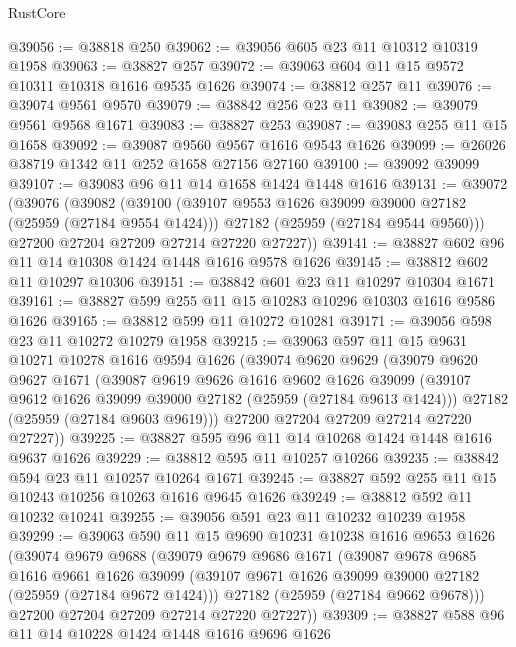 \begin{lexlean}{RustCore}
\begin{coremodule}
@39056 := @38818 @250
@39062 := @39056 @605 @23 @11 @10312 @10319 @1958
@39063 := @38827 @257
@39072 := @39063 @604 @11 @15 @9572 @10311 @10318 @1616 @9535 @1626
@39074 := @38812 @257 @11
@39076 := @39074 @9561 @9570
@39079 := @38842 @256 @23 @11
@39082 := @39079 @9561 @9568 @1671
@39083 := @38827 @253
@39087 := @39083 @255 @11 @15 @1658
@39092 := @39087 @9560 @9567 @1616 @9543 @1626
@39099 := @26026 @38719 @1342 @11 @252 @1658 @27156 @27160
@39100 := @39092 @39099
@39107 := @39083 @96 @11 @14 @1658 @1424 @1448 @1616
@39131 := @39072
    (@39076
      (@39082
        (@39100
          (@39107 @9553 @1626 @39099 @39000 @27182 (@25959 (@27184 @9554 @1424)))
          @27182
          (@25959 (@27184 @9544 @9560)))
        @27200
        @27204
        @27209
        @27214
        @27220
        @27227))
@39141 := @38827 @602 @96 @11 @14 @10308 @1424 @1448 @1616 @9578 @1626
@39145 := @38812 @602 @11 @10297 @10306
@39151 := @38842 @601 @23 @11 @10297 @10304 @1671
@39161 := @38827 @599 @255 @11 @15 @10283 @10296 @10303 @1616 @9586 @1626
@39165 := @38812 @599 @11 @10272 @10281
@39171 := @39056 @598 @23 @11 @10272 @10279 @1958
@39215 := @39063
    @597
    @11
    @15
    @9631
    @10271
    @10278
    @1616
    @9594
    @1626
    (@39074
      @9620
      @9629
      (@39079
        @9620
        @9627
        @1671
        (@39087
          @9619
          @9626
          @1616
          @9602
          @1626
          @39099
          (@39107 @9612 @1626 @39099 @39000 @27182 (@25959 (@27184 @9613 @1424)))
          @27182
          (@25959 (@27184 @9603 @9619)))
        @27200
        @27204
        @27209
        @27214
        @27220
        @27227))
@39225 := @38827 @595 @96 @11 @14 @10268 @1424 @1448 @1616 @9637 @1626
@39229 := @38812 @595 @11 @10257 @10266
@39235 := @38842 @594 @23 @11 @10257 @10264 @1671
@39245 := @38827 @592 @255 @11 @15 @10243 @10256 @10263 @1616 @9645 @1626
@39249 := @38812 @592 @11 @10232 @10241
@39255 := @39056 @591 @23 @11 @10232 @10239 @1958
@39299 := @39063
    @590
    @11
    @15
    @9690
    @10231
    @10238
    @1616
    @9653
    @1626
    (@39074
      @9679
      @9688
      (@39079
        @9679
        @9686
        @1671
        (@39087
          @9678
          @9685
          @1616
          @9661
          @1626
          @39099
          (@39107 @9671 @1626 @39099 @39000 @27182 (@25959 (@27184 @9672 @1424)))
          @27182
          (@25959 (@27184 @9662 @9678)))
        @27200
        @27204
        @27209
        @27214
        @27220
        @27227))
@39309 := @38827 @588 @96 @11 @14 @10228 @1424 @1448 @1616 @9696 @1626

\end{coremodule}
\end{lexlean}
